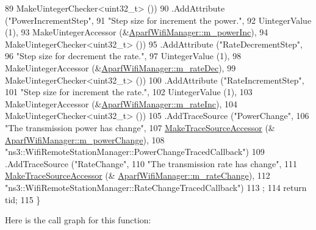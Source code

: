 \begin{DoxyCode}
89                    MakeUintegerChecker<uint32\_t> ())
90     .AddAttribute (\textcolor{stringliteral}{"PowerIncrementStep"},
91                    \textcolor{stringliteral}{"Step size for increment the power."},
92                    UintegerValue (1),
93                    MakeUintegerAccessor (&\hyperlink{classns3_1_1AparfWifiManager_aa9276b0b5e0bfdf2b9d81e2c2a46f6a3}{AparfWifiManager::m\_powerInc}),
94                    MakeUintegerChecker<uint32\_t> ())
95     .AddAttribute (\textcolor{stringliteral}{"RateDecrementStep"},
96                    \textcolor{stringliteral}{"Step size for decrement the rate."},
97                    UintegerValue (1),
98                    MakeUintegerAccessor (&\hyperlink{classns3_1_1AparfWifiManager_a829dd14adfa5d780b324f7dca7f37362}{AparfWifiManager::m\_rateDec}),
99                    MakeUintegerChecker<uint32\_t> ())
100     .AddAttribute (\textcolor{stringliteral}{"RateIncrementStep"},
101                    \textcolor{stringliteral}{"Step size for increment the rate."},
102                    UintegerValue (1),
103                    MakeUintegerAccessor (&\hyperlink{classns3_1_1AparfWifiManager_a46d7ecaf54a04e145e4be183c042a65e}{AparfWifiManager::m\_rateInc}),
104                    MakeUintegerChecker<uint32\_t> ())
105     .AddTraceSource (\textcolor{stringliteral}{"PowerChange"},
106                      \textcolor{stringliteral}{"The transmission power has change"},
107                      \hyperlink{group__tracing_gab21a770b9855af4e8f69f7531ea4a6b0}{MakeTraceSourceAccessor} (&
      \hyperlink{classns3_1_1AparfWifiManager_aa08f36618a5a666a4bf9d58f25c7efc3}{AparfWifiManager::m\_powerChange}),
108                      \textcolor{stringliteral}{"ns3::WifiRemoteStationManager::PowerChangeTracedCallback"})
109     .AddTraceSource (\textcolor{stringliteral}{"RateChange"},
110                      \textcolor{stringliteral}{"The transmission rate has change"},
111                      \hyperlink{group__tracing_gab21a770b9855af4e8f69f7531ea4a6b0}{MakeTraceSourceAccessor} (&
      \hyperlink{classns3_1_1AparfWifiManager_af4fc339c43403d3dbbf6d547d5342af3}{AparfWifiManager::m\_rateChange}),
112                      \textcolor{stringliteral}{"ns3::WifiRemoteStationManager::RateChangeTracedCallback"})
113   ;
114   \textcolor{keywordflow}{return} tid;
115 \}
\end{DoxyCode}


Here is the call graph for this function\+:


